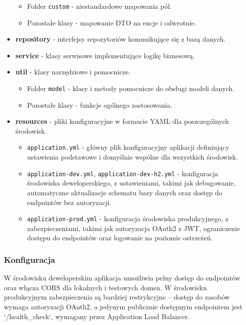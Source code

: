 \documentclass[../../main.tex]{subfiles}
\begin{document}
\begin{itemize}
        \begin{itemize}
            \item Folder \texttt{custom} - niestandardowe mapowania pól.
            \item Pozostałe klasy - mapowanie DTO na encje i odwrotnie.
        \end{itemize}
        \item \textbf{repository} - interfejsy repozytoriów komunikujące się z bazą danych.
        \item \textbf{service} - klasy serwisowe implementujące logikę biznesową.
        \item \textbf{util} - klasy narzędziowe i pomocnicze.
        \begin{itemize}
            \item Folder \texttt{model} - klasy i metody pomocnicze do obsługi modeli danych.
            \item Pozostałe klasy - funkcje ogólnego zastosowania.
        \end{itemize}
        \item \textbf{resources} - pliki konfiguracyjne w formacie YAML dla poszczególnych środowisk.
        \begin{itemize}
            \item \texttt{application.yml} - główny plik konfiguracyjny aplikacji definiujący ustawienia podstawowe i domyślnie wspólne dla wszystkich środowisk.
            \item \texttt{application-dev.yml}, \texttt{application-dev-h2.yml} - konfiguracja środowiska deweloperskiego, z ustawieniami, takimi jak debugowanie, automatyczne aktualizacje schematu bazy danych oraz dostęp do endpointów bez autoryzacji.
            \item \texttt{application-prod.yml} - konfiguracja środowiska produkcyjnego, z zabezpieczeniami, takimi jak autoryzacja OAuth2 z JWT, ograniczenie dostępu do endpointów oraz logowanie na poziomie ostrzeżeń.
        \end{itemize}
    \end{itemize}

    \subsubsection{Konfiguracja}
    W środowisku deweloperskim aplikacja umożliwia pełny dostęp do endpointów oraz włącza CORS dla lokalnych i testowych domen.
    W środowisku produkcyjnym zabezpieczenia są bardziej restrykcyjne – dostęp do zasobów wymaga autoryzacji OAuth2, a jedynym publicznie dostępnym endpointem jest `/health\_check`, wymagany przez Application Load Balancer.
\end{document}
